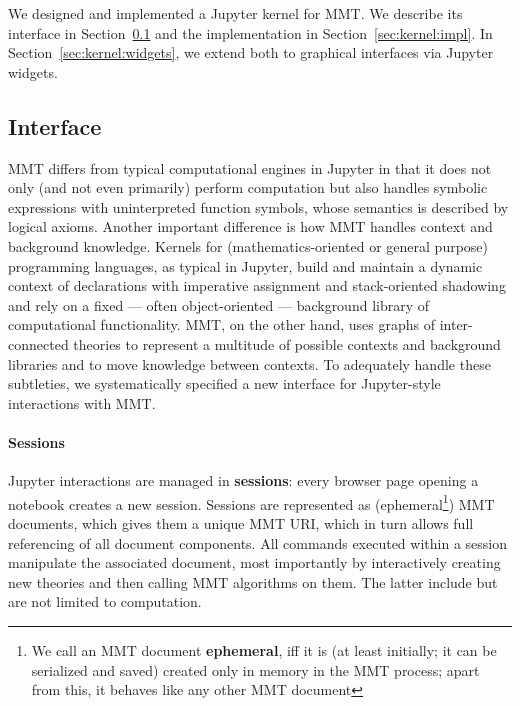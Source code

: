 We designed and implemented a Jupyter kernel for MMT.
We describe its interface in Section~\ref{sec:kernel:syntax} and the implementation in Section~\ref{sec:kernel:impl}.
In Section~\ref{sec:kernel:widgets}, we extend both to graphical interfaces via Jupyter widgets.

\subsection{Interface}\label{sec:kernel:syntax}

MMT differs from typical computational engines in Jupyter in that it does not only (and not even primarily) perform computation but also handles symbolic expressions with uninterpreted function symbols, whose semantics is described by logical axioms.
Another important difference is how MMT handles context and background knowledge.
Kernels for (mathematics-oriented or general purpose) programming languages, as typical in Jupyter, build and maintain a dynamic context of declarations with imperative assignment and stack-oriented shadowing and rely on a fixed --- often object-oriented --- background library of computational functionality.
MMT, on the other hand, uses graphs of inter-connected theories to represent a multitude of possible contexts and background libraries and to move knowledge between contexts.
To adequately handle these subtleties, we systematically specified a new interface for Jupyter-style interactions with MMT.

\paragraph{Sessions}
Jupyter interactions are managed in \textbf{sessions}: every browser page opening a notebook creates a new session.
Sessions are represented as (ephemeral\footnote{We call an MMT document \textbf{ephemeral}, iff it is (at least initially; it can be serialized and saved) created only in memory in the MMT process; apart from this, it behaves like any other MMT document}) MMT documents, which gives them a unique MMT URI, which in turn allows full referencing of all document components.
All commands executed within a session manipulate the associated document, most importantly by interactively creating new theories and then calling MMT algorithms on them.
The latter include but are not limited to computation.

